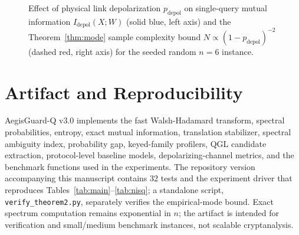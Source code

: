 \documentclass[10pt,twocolumn]{article}
\theoremstyle{definition}
\begin{document}
\begin{figure}[t]
\centering
{}
\caption{Effect of physical link depolarization $p_{\mathrm{depol}}$ on single-query mutual information $I_{\mathrm{depol}}(X;W)$ (solid blue, left axis) and the Theorem~\ref{thm:mode} sample complexity bound $N \propto (1 - p_{\mathrm{depol}})^{-2}$ (dashed red, right axis) for the seeded random $n=6$ instance.}
\label{fig:nisq_plot}
\end{figure}

\section{Artifact and Reproducibility}

AegisGuard-Q v3.0 implements the fast Walsh-Hadamard transform, spectral probabilities, entropy, exact mutual information, translation stabilizer, spectral ambiguity index, probability gap, keyed-family profilers, QGL candidate extraction, protocol-level baseline models, depolarizing-channel metrics, and the benchmark functions used in the experiments. The repository version accompanying this manuscript contains 32 tests and the experiment driver that reproduces Tables~\ref{tab:main}--\ref{tab:nisq}; a standalone script, \texttt{verify\_theorem2.py}, separately verifies the empirical-mode bound. Exact spectrum computation remains exponential in $n$; the artifact is intended for verification and small/medium benchmark instances, not scalable cryptanalysis.
\end{document}
